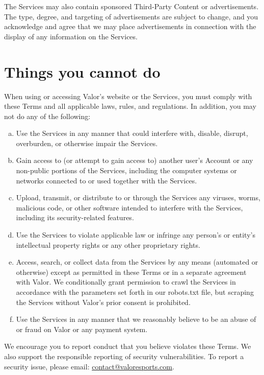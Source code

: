 \documentclass[10pt]{article}
\begin{document}
The Services may also contain sponsored Third-Party Content or advertisements. The type, degree, and targeting of advertisements are subject to change, and you acknowledge and agree that we may place advertisements in connection with the display of any information on the Services.


\section{Things you cannot do}
\label{sec:things-you-cannot-do}
When using or accessing Valor's website or the Services, you must comply with these Terms and all applicable laws, rules, and regulations. In addition, you may not do any of the following:
\begin{enumerate}[(a)]
	\item
	Use the Services in any manner that could interfere with, disable, disrupt, overburden, or otherwise impair the Services.
	
	\item
	Gain access to (or attempt to gain access to) another user's Account or any non-public portions of the Services, including the computer systems or networks connected to or used together with the Services.
	
	\item
	Upload, transmit, or distribute to or through the Services any viruses, worms, malicious code, or other software intended to interfere with the Services, including its security-related features.
	
	\item
	Use the Services to violate applicable law or infringe any person's or entity's intellectual property rights or any other proprietary rights.
	
	\item
	Access, search, or collect data from the Services by any means (automated or otherwise) except as permitted in these Terms or in a separate agreement with Valor. We conditionally grant permission to crawl the Services in accordance with the parameters set forth in our robots.txt file, but scraping the Services without Valor's prior consent is prohibited.
	
	\item
	Use the Services in any manner that we reasonably believe to be an abuse of or fraud on Valor or any payment system.
\end{enumerate}

We encourage you to report conduct that you believe violates these Terms. We also support the responsible reporting of security vulnerabilities. To report a security issue, please email: \href{mailto:contact@valoresports.com}{contact@valoresports.com}.
\end{document}
